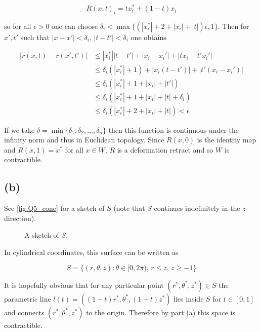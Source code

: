 \documentclass{article}
\newcommand{\coneback}[4][]{
  \draw[canvas is xy plane at z=#2, #1] (\tdplotmainphi-#4:#3) 
  arc(\tdplotmainphi-#4:\tdplotmainphi+180+#4:#3) -- (O) --cycle;
  }
\newcommand{\conefront}[4][]{
  \draw[canvas is xy plane at z=#2, #1] (\tdplotmainphi-#4:#3) arc
  (\tdplotmainphi-#4:\tdplotmainphi-180+#4:#3) -- (O) --cycle;
  }
\begin{document}
\begin{equation*}
    R(x,t)_i = tx_i^* + (1-t)x_i
\end{equation*}

so for all $\epsilon > 0$ one can choose $\delta_i < \max\{(|x^*_i| + 2 + |x_i| + |t|)\epsilon,1\}$. Then for 
$x',t'$ such that $|x - x'| < \delta_i$, $|t-t'| < \delta_i$ one obtains

\begin{align*}
    |r(x,t) - r(x',t')| &\leq |x^*_i||t - t'| + |x_i-x_i'| + |tx_i - t'x_i'| \\
    &\leq \delta_i(|x^*_i| + 1) + |x_i(t-t')| + |t'(x_i-x_i')| \\
    &\leq \delta_i(|x_i^*| + 1 + |x_i| + |t'|) \\
    &\leq \delta_i(|x_i^*| + 1 + |x_i| + |t| + \delta_i) \\
    &\leq \delta_i(|x_i^*| + 2 + |x_i| + |t|) < \epsilon
\end{align*}

If we take $\delta = \min\{\delta_1,\delta_2,\dots,\delta_n\}$ then this function is 
continuous under the infinity norm and thus in Euclidean topology. Since $R(x,0)$ is the 
identity map and $R(x,1) = x^*$ for all $x \in W$, $R$ is a deformation retract and so 
$W$ is contractible.

\subsection*{(b)}
See \autoref{fig:Q5_cone} for a sketch of $S$ (note that $S$ continues indefinitely in the $z$ direction). 

\begin{figure}[H]
    \centering
    
    \caption{A sketch of $S$.}
    \label{fig:Q5_cone}
\end{figure}

In cylindrical coordinates, this surface can be written as 

\begin{equation*}
    S = \{(r,\theta,z): \theta \in [0,2\pi),\, r \leq z, \, z \geq -1\}
\end{equation*}

It is hopefully obvious that for any particular point $(r^*,\theta^*,z^*) \in S$ the 
parametric line $l(t) = ((1-t)r^*,\theta^*,(1-t)z^*)$ lies inside $S$ for 
$t \in [0,1]$ and connects $(r^*,\theta^*,z^*)$ to the origin. Therefore by part (a) 
this space is contractible.
\end{document}
